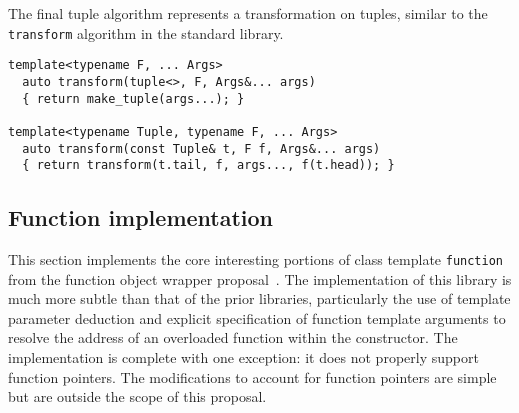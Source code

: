 \documentclass{article}
\begin{document}
The final tuple algorithm represents a transformation on tuples,
similar to the {\tt transform} algorithm in the standard library.
\begin{verbatim}
template<typename F, ... Args>
  auto transform(tuple<>, F, Args&... args)
  { return make_tuple(args...); }

template<typename Tuple, typename F, ... Args>
  auto transform(const Tuple& t, F f, Args&... args)
  { return transform(t.tail, f, args..., f(t.head)); }
\end{verbatim}

\subsection{Function implementation}
\label{functionimpl}
This section implements the core interesting portions of class
template {\tt function} from the function object wrapper
proposal~\cite{Gregor02}. The implementation of this library is much
more subtle than that of the prior libraries, particularly the use of
template parameter deduction and explicit specification of function
template arguments to resolve the address of an overloaded function
within the constructor. The implementation is complete with one
exception: it does not properly support function pointers. The
modifications to account for function pointers are simple but are
outside the scope of this proposal.
\end{document}
